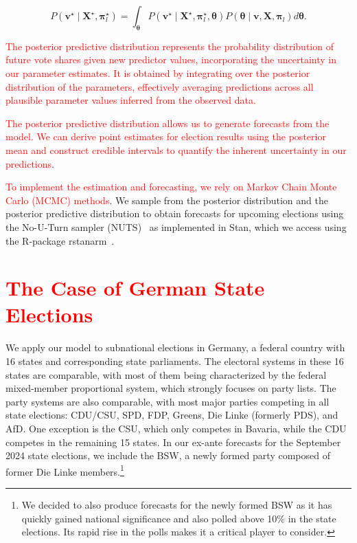 \documentclass[doublespaced,12pt]{article}
\begin{document}
\begin{doublespacing}
\begin{equation}
P\left(\bm{v}^{\star} \mid \bm{X}^{\star}, \bm{\pi}_{l}^{\star} \right) = \int_{\bm{\theta}} P\left(\bm{v}^{\star} \mid \bm{X}^{\star},  \bm{\pi}_{l}^{\star},  \bm{\theta} \right)  P\left(\bm{\theta} \mid \bm{v}, \bm{X},  \bm{\pi}_{l}  \right) d\bm{\theta}.
\end{equation}

\textcolor{red}{The posterior predictive distribution represents the probability distribution of future vote shares given new predictor values, incorporating the uncertainty in our parameter estimates. It is obtained by integrating over the posterior distribution of the parameters, effectively averaging predictions across all plausible parameter values inferred from the observed data.}

\textcolor{red}{The posterior predictive distribution allows us to generate forecasts from the model. We can derive point estimates for election results using the posterior mean and construct credible intervals to quantify the inherent uncertainty in our predictions}. 
 

\textcolor{red}{To implement the estimation and forecasting, we rely on Markov Chain Monte Carlo (MCMC) methods}. We sample from the posterior distribution and the posterior predictive distribution to obtain forecasts for upcoming elections using the No-U-Turn sampler (NUTS)~\citep{carpenter2017stan} as implemented in Stan, which we access using the R-package rstanarm~\citep{rstanarm}.  

\section{\textcolor{red}{The Case of German State Elections}}


We apply our model to subnational elections in Germany, a federal country with 16 states and corresponding state parliaments.  The electoral systems in these 16 states are comparable, with most of them being characterized by the federal mixed-member proportional system, which strongly focuses on party lists. The party systems are also comparable, with most major parties competing in all state elections: CDU/CSU, SPD, FDP, Greens, Die Linke (formerly PDS), and AfD. One exception is the CSU, which only competes in Bavaria, while the CDU competes in the remaining 15 states. In our ex-ante forecasts for the September 2024 state elections, we include the BSW, a newly formed party composed of former Die Linke members.\footnote{We decided to also produce forecasts for the newly formed BSW as it has quickly gained national significance and also polled above 10\% in the state elections. Its rapid rise in the polls makes it a critical player to consider. }


\end{doublespacing}
\end{document}
